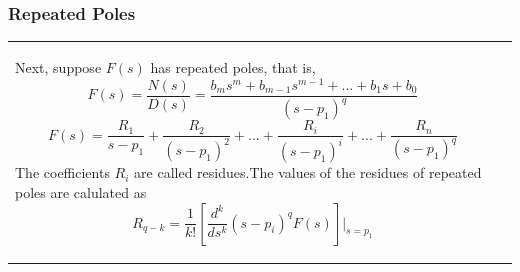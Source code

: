 \documentclass[aspectratio=169]{beamer}
\begin{document}
\begin{frame}[fragile]
	\frametitle{Repeated Poles}
\begin{tabular}{ll}

	\begin{columns}
	\small	\begin{column}{1\textwidth}  %

	Next, suppose $F(s)$ has repeated poles, that is,
	$$F(s)=\dfrac{N(s)}{D(s)}=\dfrac{b_ms^m+b_{m-1}s^{m-1}+...+b_{1}s+b_{0}}{(s-p_1)^q} $$
	$$F(s)=\dfrac{R_1}{s-p_1}+\dfrac{R_2}{(s-p_1)^2}+...+\dfrac{R_i}{(s-p_1)^i}+...+\dfrac{R_n}{(s-p_1)^q} $$
	The coefficients $R_i$ are called residues.The values of the residues of repeated poles are calulated as	
	$$R_{q-k}=\dfrac{1}{k!}[\dfrac{d^k}{ds^k}(s-p_i)^qF(s)] \big|_{s=p_1}$$
	\end{column}	
	\end{columns}\\
\end{tabular}	
\end{frame}
\end{document}
